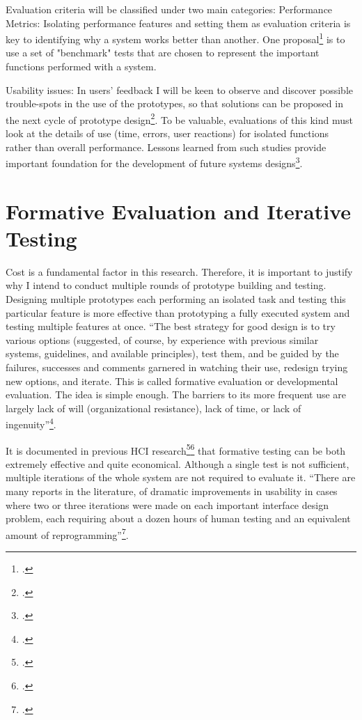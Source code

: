 Evaluation criteria will be classified under two main categories:
Performance Metrics: Isolating performance features and setting them as evaluation criteria is key to identifying why a system works better than another. One proposal\footcite{Roberts1983} is to use a set of "benchmark" tests that are chosen to represent the important functions performed with a system.

Usability issues: In users’ feedback I will be keen to observe and discover possible trouble-spots in the use of the prototypes, so that solutions can be proposed in the next cycle of prototype design\footcite{Klasnja2011}. To be valuable, evaluations of this kind must look at the details of use (time, errors, user reactions) for isolated functions rather than overall performance. Lessons learned from such studies provide important foundation for the development of future systems designs\footcite{Cox2008}.

\section{Formative Evaluation and Iterative Testing}

Cost is a fundamental factor in this research. Therefore, it is important to justify why I intend to conduct multiple rounds of prototype building and testing. Designing multiple prototypes each performing an isolated task and testing this particular feature is more effective than prototyping a fully executed system and testing multiple features at once. ``The best strategy for good design is to try various options (suggested, of course, by experience with previous similar systems, guidelines, and available principles), test them, and be guided by the failures, successes and comments garnered in watching their use, redesign trying new options, and iterate. This is called formative evaluation or developmental evaluation. The idea is simple enough. The barriers to its more frequent use are largely lack of will (organizational resistance), lack of time, or lack of ingenuity''\footcite{Dix2004}. 

It is documented in previous HCI research\footcite{Cox2008}\footcite{Lazar2010} that formative testing can be both extremely effective and quite economical. Although a single test is not sufficient, multiple iterations of the whole system are not required to evaluate it. ``There are many reports in the literature, of dramatic improvements in usability in cases where two or three iterations were made on each important interface design problem, each requiring about a dozen hours of human testing and an equivalent amount of reprogramming''\footcite{Georges2004}.

